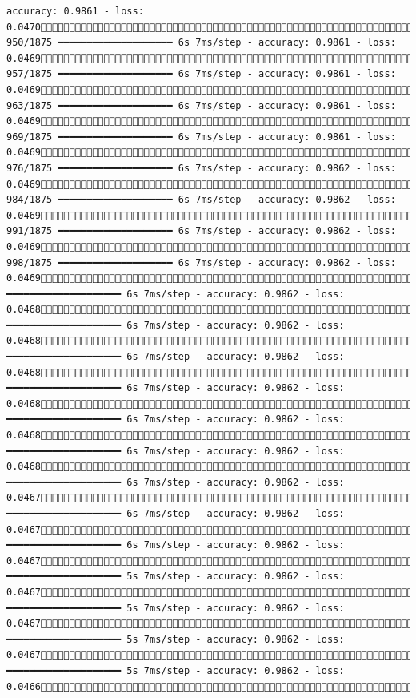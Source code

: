 \documentclass[
  letterpaper,
  DIV=11,
  numbers=noendperiod]{scrreprt}
\begin{document}
\begin{verbatim}
accuracy: 0.9861 - loss: 0.0470 950/1875 ━━━━━━━━━━━━━━━━━━━━ 6s 7ms/step - accuracy: 0.9861 - loss: 0.0469 957/1875 ━━━━━━━━━━━━━━━━━━━━ 6s 7ms/step - accuracy: 0.9861 - loss: 0.0469 963/1875 ━━━━━━━━━━━━━━━━━━━━ 6s 7ms/step - accuracy: 0.9861 - loss: 0.0469 969/1875 ━━━━━━━━━━━━━━━━━━━━ 6s 7ms/step - accuracy: 0.9861 - loss: 0.0469 976/1875 ━━━━━━━━━━━━━━━━━━━━ 6s 7ms/step - accuracy: 0.9862 - loss: 0.0469 984/1875 ━━━━━━━━━━━━━━━━━━━━ 6s 7ms/step - accuracy: 0.9862 - loss: 0.0469 991/1875 ━━━━━━━━━━━━━━━━━━━━ 6s 7ms/step - accuracy: 0.9862 - loss: 0.0469 998/1875 ━━━━━━━━━━━━━━━━━━━━ 6s 7ms/step - accuracy: 0.9862 - loss: 0.04691007/1875 ━━━━━━━━━━━━━━━━━━━━ 6s 7ms/step - accuracy: 0.9862 - loss: 0.04681014/1875 ━━━━━━━━━━━━━━━━━━━━ 6s 7ms/step - accuracy: 0.9862 - loss: 0.04681021/1875 ━━━━━━━━━━━━━━━━━━━━ 6s 7ms/step - accuracy: 0.9862 - loss: 0.04681028/1875 ━━━━━━━━━━━━━━━━━━━━ 6s 7ms/step - accuracy: 0.9862 - loss: 0.04681035/1875 ━━━━━━━━━━━━━━━━━━━━ 6s 7ms/step - accuracy: 0.9862 - loss: 0.04681043/1875 ━━━━━━━━━━━━━━━━━━━━ 6s 7ms/step - accuracy: 0.9862 - loss: 0.04681051/1875 ━━━━━━━━━━━━━━━━━━━━ 6s 7ms/step - accuracy: 0.9862 - loss: 0.04671059/1875 ━━━━━━━━━━━━━━━━━━━━ 6s 7ms/step - accuracy: 0.9862 - loss: 0.04671066/1875 ━━━━━━━━━━━━━━━━━━━━ 6s 7ms/step - accuracy: 0.9862 - loss: 0.04671075/1875 ━━━━━━━━━━━━━━━━━━━━ 5s 7ms/step - accuracy: 0.9862 - loss: 0.04671082/1875 ━━━━━━━━━━━━━━━━━━━━ 5s 7ms/step - accuracy: 0.9862 - loss: 0.04671089/1875 ━━━━━━━━━━━━━━━━━━━━ 5s 7ms/step - accuracy: 0.9862 - loss: 0.04671097/1875 ━━━━━━━━━━━━━━━━━━━━ 5s 7ms/step - accuracy: 0.9862 - loss: 0.04661104/1875 
\end{verbatim}
\end{document}
